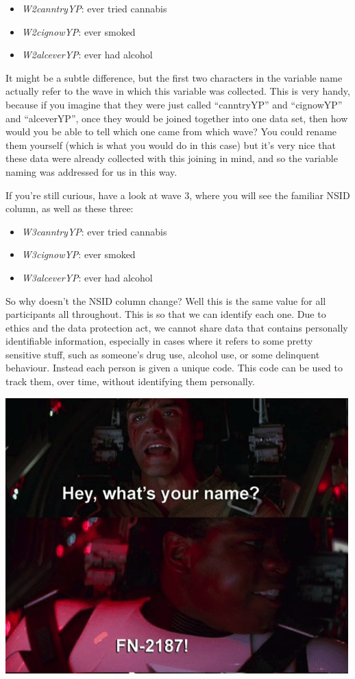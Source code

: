 \documentclass[
]{book}
\providecommand{\tightlist}{%
  \setlength{\itemsep}{0pt}\setlength{\parskip}{0pt}}
\begin{document}
\begin{itemize}
\tightlist
\item
  \emph{W2canntryYP}: ever tried cannabis\\
\item
  \emph{W2cignowYP}: ever smoked
\item
  \emph{W2alceverYP}: ever had alcohol
\end{itemize}

It might be a subtle difference, but the first two characters in the variable name actually refer to the wave in which this variable was collected. This is very handy, because if you imagine that they were just called ``canntryYP'' and ``cignowYP'' and ``alceverYP'', once they would be joined together into one data set, then how would you be able to tell which one came from which wave? You could rename them yourself (which is what you would do in this case) but it's very nice that these data were already collected with this joining in mind, and so the variable naming was addressed for us in this way.

If you're still curious, have a look at wave 3, where you will see the familiar NSID column, as well as these three:

\begin{itemize}
\tightlist
\item
  \emph{W3canntryYP}: ever tried cannabis\\
\item
  \emph{W3cignowYP}: ever smoked
\item
  \emph{W3alceverYP}: ever had alcohol
\end{itemize}

So why doesn't the NSID column change? Well this is the same value for all participants all throughout. This is so that we can identify each one. Due to ethics and the data protection act, we cannot share data that contains personally identifiable information, especially in cases where it refers to some pretty sensitive stuff, such as someone's drug use, alcohol use, or some delinquent behaviour. Instead each person is given a unique code. This code can be used to track them, over time, without identifying them personally.

\includegraphics{imgs/fn2187.png}
\end{document}

